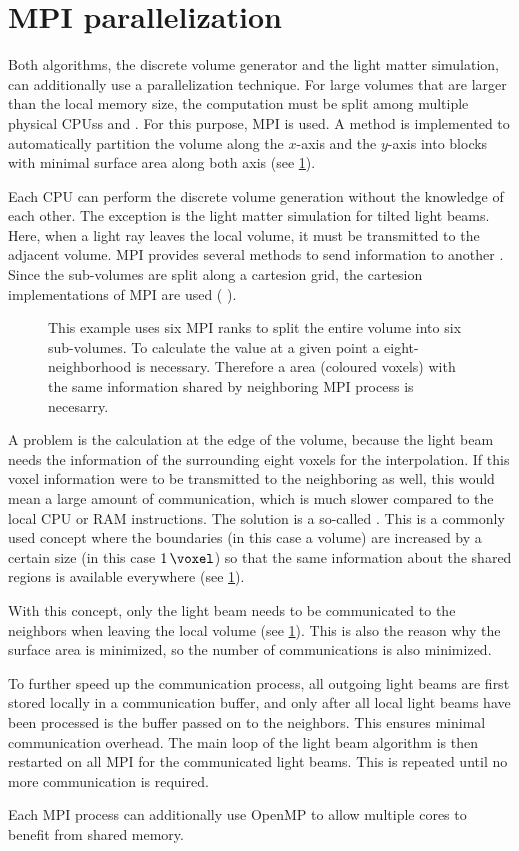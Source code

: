 \section{MPI parallelization}\label{sec:mpiSim}
%
Both algorithms, the discrete volume generator and the light matter simulation, can additionally use a parallelization technique.
For large volumes that are larger than the local memory size, the computation must be split among multiple physical \acp{CPU}s and .
For this purpose,  \ac{MPI} is used.
A method is implemented to automatically partition the volume along the $x$-axis and the $y$-axis into blocks with minimal surface area along both axis (see \cref{fig:com_halo}).
\par
% 
Each \ac{CPU} can perform the discrete volume generation without the knowledge of each other.
The exception is the light matter simulation for tilted light beams.
Here, when a light ray leaves the local volume, it must be transmitted to the adjacent volume.
\ac{MPI} provides several methods to send information to another .
Since the sub-volumes are split along a cartesion grid, the cartesion implementations of \ac{MPI} are used (\eg{} ).
%
\begin{figure}[!t]
    \centering
    \setlength{\tikzwidth}{0.85\textwidth}
    \caption{ This example uses six \ac{MPI} ranks to split the entire volume into six sub-volumes. To calculate the value at a given point a eight-neighborhood is necessary. Therefore a  area (coloured voxels) with the same information shared by neighboring \ac{MPI} process is necesarry.}
    \label{fig:com_halo}
\end{figure}
%
A problem is the calculation at the edge of the volume, because the light beam needs the information of the surrounding eight voxels for the interpolation.
If this voxel information were to be transmitted to the neighboring  as well, this would mean a large amount of communication, which is much slower compared to the local \ac{CPU} or \ac{RAM} instructions.
The solution is a so-called .
This is a commonly used concept where the boundaries (in this case a volume) are increased by a certain size (in this case $\SI{1}{\voxel}$) so that the same information about the shared regions is available everywhere (see \cref{fig:com_halo}).
\par
%
With this concept, only the light beam needs to be communicated to the neighbors when leaving the local volume (see \cref{fig:com_halo}).
This is also the reason why the surface area is minimized, so the number of communications is also minimized.
\par
% 
To further speed up the communication process, all outgoing light beams are first stored locally in a communication buffer, and only after all local light beams have been processed is the buffer passed on to the neighbors.
This ensures minimal communication overhead.
The main loop of the light beam algorithm is then restarted on all \ac{MPI}  for the communicated light beams.
This is repeated until no more communication is required.
\par
%
Each \ac{MPI} process can additionally use \ac{OpenMP} to allow multiple cores to benefit from shared memory.
